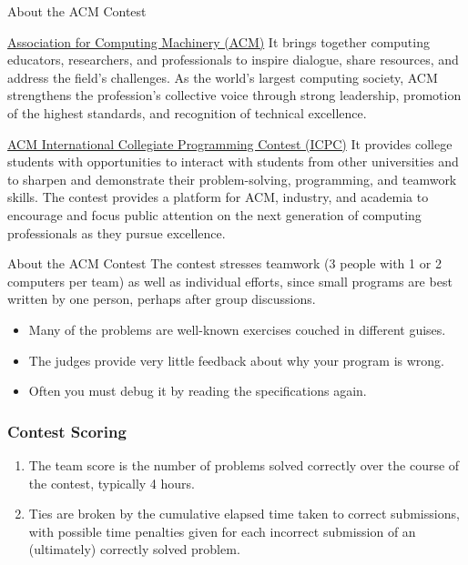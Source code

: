 \documentclass{beamer}
\begin{document}
\begin{frame}{About the ACM Contest}

  \begin{block}{\href{https://www.acm.org/}{Association for Computing Machinery (ACM)}}
    It brings together computing educators, researchers, and professionals to inspire dialogue, share resources, and address the field's challenges. As the world’s largest computing society, ACM strengthens the profession's collective voice through strong leadership, promotion of the highest standards, and recognition of technical excellence. 
  \end{block}

  \begin{block}{\href{https://icpc.baylor.edu/}{ACM International Collegiate Programming Contest (ICPC)}}
    It provides college students with opportunities to interact with students from other universities and to sharpen and demonstrate their problem-solving, programming, and teamwork skills. 
   The contest provides a platform for ACM, industry, and academia to encourage and focus public attention on the next generation of computing professionals as they pursue excellence.
 \end{block}
\end{frame}


\begin{frame}{About the ACM Contest}
  The contest stresses teamwork (3 people with 1 or 2 computers per team) as well as individual efforts, since small programs are best written by one person, perhaps after group discussions.
  
  \begin{itemize}
  \item Many of the problems are well-known exercises couched in different guises.
  \item The  judges  provide  very  little  feedback  about  why  your program is wrong.
  \item Often you must debug it by reading the specifications again.
  \end{itemize}
  
\end{frame}

\begin{frame}
  \frametitle{Contest Scoring}

  \begin{enumerate}
  \item \alert{The team score is the number of problems solved correctly} over the course of the contest, typically 4 hours.
  \item Ties are broken by the cumulative elapsed time taken to correct submissions, with possible time penalties given for each incorrect submission of an (ultimately) correctly solved problem.
  \end{enumerate}

\end{frame}
\end{document}
